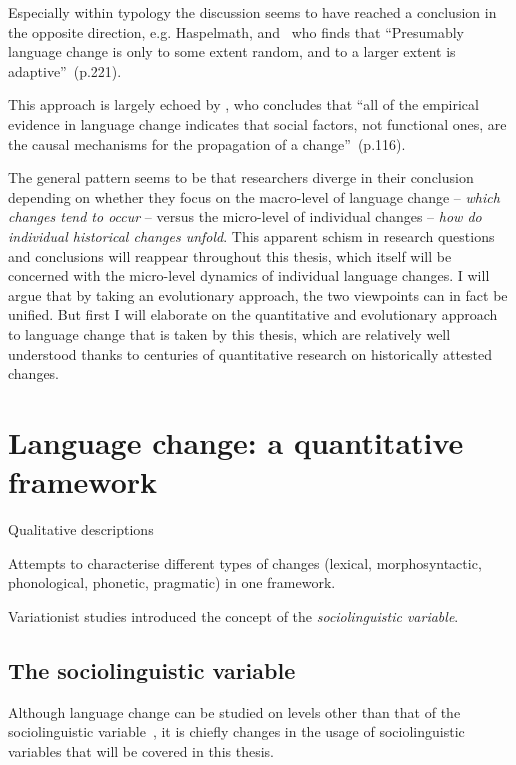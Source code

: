 Especially within typology the discussion seems to have reached a conclusion in the opposite direction, e.g. Haspelmath, and~\citet{Wichmann2015} who finds that ``Presumably language change is only to some extent random, and to a larger extent is adaptive''~(p.221).

This approach is largely echoed by \citet{Croft2006}, who concludes that ``all of the empirical evidence in language change indicates that social factors, not functional ones, are the causal mechanisms for the propagation of a change''~(p.116).



The general pattern seems to be that researchers diverge in their conclusion depending on whether they focus on the macro-level of language change -- \emph{which changes tend to occur} -- versus the micro-level of individual changes -- \emph{how do individual historical changes unfold}. This apparent schism in research questions and conclusions will reappear throughout this thesis, which itself will be concerned with the micro-level dynamics of individual language changes.
I will argue that by taking an evolutionary approach, the two viewpoints can in fact be unified.
But first I will elaborate on the quantitative and evolutionary approach to language change that is taken by this thesis, which are relatively well understood thanks to centuries of quantitative research on historically attested changes.

\section{Language change: a quantitative framework}

Qualitative descriptions

Attempts to characterise different types of changes (lexical, morphosyntactic, phonological, phonetic, pragmatic) in one framework.

Variationist studies introduced the concept of the \emph{sociolinguistic variable}.

\subsection{The sociolinguistic variable}
\label{sec:sociolinguisticvariable}

\citep[p.]{Tagliamonte2012}

Although language change can be studied on levels other than that of the sociolinguistic variable~\citep[see in particular][p.98]{Croft2006}, it is chiefly changes in the usage of sociolinguistic variables that will be covered in this thesis.

